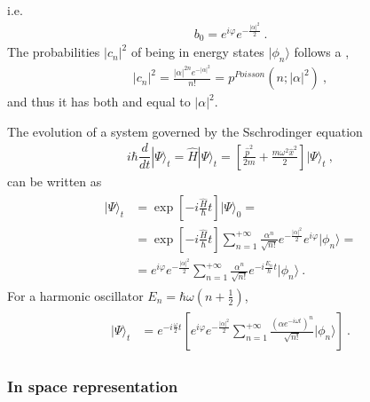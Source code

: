 \documentclass[letterpaper,10pt,english]{jupyterBook}
\begin{document}
\sphinxAtStartPar
i.e.
\begin{equation*}
\begin{split}b_0 = e^{i \varphi} e^{- \frac{|\alpha|^2}{2}} \ .\end{split}
\end{equation*}
\sphinxAtStartPar
{} The probabilities \(|c_n|^2\) of being in energy states \(| \phi_n \rangle\) follows a ,
\begin{equation*}
\begin{split}| c_n |^2 = \frac{ |\alpha|^{2n} e^{-|\alpha|^2}}{n!} = p^{Poisson} (n; |\alpha|^2) \ ,\end{split}
\end{equation*}
\sphinxAtStartPar
and thus it has both  and  equal to \(|\alpha|^2\).

\sphinxAtStartPar
{} The evolution of a system governed by the Sschrodinger equation
\begin{equation*}
\begin{split}i \hbar \dfrac{d}{dt} | \Psi \rangle_t = \hat{H} | \Psi \rangle_t = \left[ \frac{\hat{p}^2}{2m} + \frac{m \omega^2 \hat{x}^2}{2} \right] | \Psi \rangle_t \ ,\end{split}
\end{equation*}
\sphinxAtStartPar
can be written as
\begin{equation*}
\begin{split}\begin{aligned}
  | \Psi \rangle_t 
  & = \exp\left[ - i \frac{\hat{H}}{\hbar} t \right] | \Psi \rangle_0 = \\
  & = \exp\left[ - i \frac{\hat{H}}{\hbar} t \right] \sum_{n=1}^{+\infty} \frac{\alpha^n}{\sqrt{n!}} e^{- \frac{|\alpha|^2}{2}} e^{i \varphi} | \phi_n \rangle = \\ 
  & = e^{i \varphi} e^{- \frac{|\alpha|^2}{2}} \sum_{n=1}^{+\infty} \frac{\alpha^n}{\sqrt{n!}} e^{-i \frac{E_n}{\hbar} t} | \phi_n \rangle \ .
\end{aligned}\end{split}
\end{equation*}
\sphinxAtStartPar
For a harmonic oscillator \(E_n = \hbar \omega \left( n + \frac{1}{2} \right)\),
\begin{equation*}
\begin{split}\begin{aligned}
  | \Psi \rangle_t 
  & = e^{-i \frac{\omega}{2} t} \left[ e^{i \varphi} e^{- \frac{|\alpha|^2}{2}} \sum_{n=1}^{+\infty} \frac{\left( \alpha e^{-i \omega t} \right)^n}{\sqrt{n!}} | \phi_n \rangle \right] \ .
\end{aligned}\end{split}
\end{equation*}\subsubsection*{In space representation}
\end{document}
